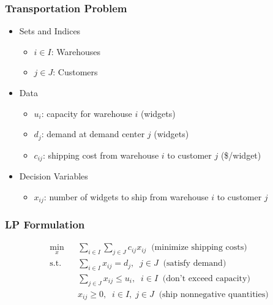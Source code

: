 \documentclass[12pt,handout]{beamer}
\begin{document}
\begin{frame}
\frametitle{Transportation Problem}
\begin{itemize}
\item Sets and Indices
    \begin{itemize}
    \item $i \in I$: Warehouses
    \item $j \in J$: Customers
    \end{itemize}
\item Data
    \begin{itemize}
    \item $u_i$: capacity for warehouse $i$ (widgets)
    \item $d_j$: demand at demand center $j$ (widgets)
    \item $c_{ij}$: shipping cost from warehouse $i$ to customer $j$ (\$/widget)
    \end{itemize}
\item Decision Variables
    \begin{itemize}
    \item $x_{ij}$: number of widgets to ship from warehouse $i$ to customer $j$
    \end{itemize}
\end{itemize}
\end{frame}

\begin{frame}
\frametitle{LP Formulation}
\begin{eqnarray}
\min_{x} && \sum_{i \in I} \sum_{j \in J} c_{ij} x_{ij} \;\; \mbox{(minimize shipping costs)} \nonumber \\
\mbox{s.t.} && \sum_{i \in I} x_{ij} = d_j,\;\;j \in J \;\; \mbox{(satisfy demand)}\nonumber \\
&& \sum_{j \in J} x_{ij} \le u_i,\;\;i \in I \;\; \mbox{(don't exceed capacity)} \nonumber \\
&& x_{ij} \ge 0, \;\;i \in I,\;j \in J \;\; \mbox{(ship nonnegative quantities)} \nonumber
\end{eqnarray}
\end{frame}
\end{document}
